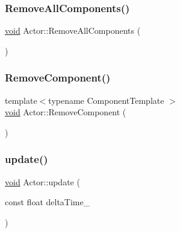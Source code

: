 \mbox{\label{classActor_ac9310e2ea7c464852e901b508a103222}} 
\subsubsection{\texorpdfstring{Remove\+All\+Components()}{RemoveAllComponents()}}
{\footnotesize\ttfamily \hyperlink{imgui__impl__opengl3__loader_8h_ac668e7cffd9e2e9cfee428b9b2f34fa7}{void} Actor\+::\+Remove\+All\+Components (\begin{DoxyParamCaption}{ }\end{DoxyParamCaption})}

\mbox{\label{classActor_ae1c8e36dc78e7faf430e76209319247d}} 
\subsubsection{\texorpdfstring{Remove\+Component()}{RemoveComponent()}}
{\footnotesize\ttfamily template$<$typename Component\+Template $>$ \\
\hyperlink{imgui__impl__opengl3__loader_8h_ac668e7cffd9e2e9cfee428b9b2f34fa7}{void} Actor\+::\+Remove\+Component (\begin{DoxyParamCaption}{ }\end{DoxyParamCaption})\hspace{0.3cm}{\ttfamily [inline]}}

\mbox{\label{classActor_a724ff8f2e9c34f15a6c443a3912504c4}} 
\subsubsection{\texorpdfstring{update()}{update()}}
{\footnotesize\ttfamily \hyperlink{imgui__impl__opengl3__loader_8h_ac668e7cffd9e2e9cfee428b9b2f34fa7}{void} Actor\+::update (\begin{DoxyParamCaption}\item[{const float}]{delta\+Time\+\_\+ }\end{DoxyParamCaption})\hspace{0.3cm}{\ttfamily [virtual]}}



